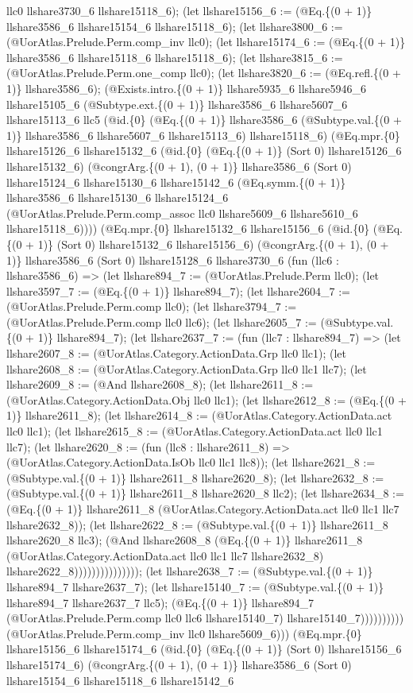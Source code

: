 \documentclass[11pt]{article}
\begin{document}
llc0 llshare3730\_6 llshare15118\_6); (let llshare15156\_6 := (@Eq.\{(0 + 1)\} llshare3586\_6 llshare15154\_6 llshare15118\_6); (let llshare3800\_6 := (@UorAtlas.Prelude.Perm.comp\_inv llc0); (let llshare15174\_6 := (@Eq.\{(0 + 1)\} llshare3586\_6 llshare15118\_6 llshare15118\_6); (let llshare3815\_6 := (@UorAtlas.Prelude.Perm.one\_comp llc0); (let llshare3820\_6 := (@Eq.refl.\{(0 + 1)\} llshare3586\_6); (@Exists.intro.\{(0 + 1)\} llshare5935\_6 llshare5946\_6 llshare15105\_6 (@Subtype.ext.\{(0 + 1)\} llshare3586\_6 llshare5607\_6 llshare15113\_6 llc5 (@id.\{0\} (@Eq.\{(0 + 1)\} llshare3586\_6 (@Subtype.val.\{(0 + 1)\} llshare3586\_6 llshare5607\_6 llshare15113\_6) llshare15118\_6) (@Eq.mpr.\{0\} llshare15126\_6 llshare15132\_6 (@id.\{0\} (@Eq.\{(0 + 1)\} (Sort 0) llshare15126\_6 llshare15132\_6) (@congrArg.\{(0 + 1), (0 + 1)\} llshare3586\_6 (Sort 0) llshare15124\_6 llshare15130\_6 llshare15142\_6 (@Eq.symm.\{(0 + 1)\} llshare3586\_6 llshare15130\_6 llshare15124\_6 (@UorAtlas.Prelude.Perm.comp\_assoc llc0 llshare5609\_6 llshare5610\_6 llshare15118\_6)))) (@Eq.mpr.\{0\} llshare15132\_6 llshare15156\_6 (@id.\{0\} (@Eq.\{(0 + 1)\} (Sort 0) llshare15132\_6 llshare15156\_6) (@congrArg.\{(0 + 1), (0 + 1)\} llshare3586\_6 (Sort 0) llshare15128\_6 llshare3730\_6 (fun (llc6 : llshare3586\_6) => (let llshare894\_7 := (@UorAtlas.Prelude.Perm llc0); (let llshare3597\_7 := (@Eq.\{(0 + 1)\} llshare894\_7); (let llshare2604\_7 := (@UorAtlas.Prelude.Perm.comp llc0); (let llshare3794\_7 := (@UorAtlas.Prelude.Perm.comp llc0 llc6); (let llshare2605\_7 := (@Subtype.val.\{(0 + 1)\} llshare894\_7); (let llshare2637\_7 := (fun (llc7 : llshare894\_7) => (let llshare2607\_8 := (@UorAtlas.Category.ActionData.Grp llc0 llc1); (let llshare2608\_8 := (@UorAtlas.Category.ActionData.Grp llc0 llc1 llc7); (let llshare2609\_8 := (@And llshare2608\_8); (let llshare2611\_8 := (@UorAtlas.Category.ActionData.Obj llc0 llc1); (let llshare2612\_8 := (@Eq.\{(0 + 1)\} llshare2611\_8); (let llshare2614\_8 := (@UorAtlas.Category.ActionData.act llc0 llc1); (let llshare2615\_8 := (@UorAtlas.Category.ActionData.act llc0 llc1 llc7); (let llshare2620\_8 := (fun (llc8 : llshare2611\_8) => (@UorAtlas.Category.ActionData.IsOb llc0 llc1 llc8)); (let llshare2621\_8 := (@Subtype.val.\{(0 + 1)\} llshare2611\_8 llshare2620\_8); (let llshare2632\_8 := (@Subtype.val.\{(0 + 1)\} llshare2611\_8 llshare2620\_8 llc2); (let llshare2634\_8 := (@Eq.\{(0 + 1)\} llshare2611\_8 (@UorAtlas.Category.ActionData.act llc0 llc1 llc7 llshare2632\_8)); (let llshare2622\_8 := (@Subtype.val.\{(0 + 1)\} llshare2611\_8 llshare2620\_8 llc3); (@And llshare2608\_8 (@Eq.\{(0 + 1)\} llshare2611\_8 (@UorAtlas.Category.ActionData.act llc0 llc1 llc7 llshare2632\_8) llshare2622\_8))))))))))))))); (let llshare2638\_7 := (@Subtype.val.\{(0 + 1)\} llshare894\_7 llshare2637\_7); (let llshare15140\_7 := (@Subtype.val.\{(0 + 1)\} llshare894\_7 llshare2637\_7 llc5); (@Eq.\{(0 + 1)\} llshare894\_7 (@UorAtlas.Prelude.Perm.comp llc0 llc6 llshare15140\_7) llshare15140\_7)))))))))) (@UorAtlas.Prelude.Perm.comp\_inv llc0 llshare5609\_6))) (@Eq.mpr.\{0\} llshare15156\_6 llshare15174\_6 (@id.\{0\} (@Eq.\{(0 + 1)\} (Sort 0) llshare15156\_6 llshare15174\_6) (@congrArg.\{(0 + 1), (0 + 1)\} llshare3586\_6 (Sort 0) llshare15154\_6 llshare15118\_6 llshare15142\_6 
\end{document}
